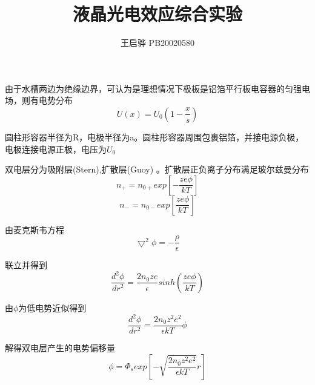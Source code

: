 \documentclass{report}
\title{\songti \zihao{2}\bfseries 液晶光电效应综合实验}
\author{王启骅 PB20020580}
\begin{document}
由于水槽两边为绝缘边界，可认为是理想情况下极板是铝箔平行板电容器的匀强电场，则有电势分布
\begin{equation}
	U(x)=U_0(1-\frac{x}{s})\nonumber
\end{equation}


圆柱形容器半径为R，电极半径为a。圆柱形容器周围包裹铝箔，并接电源负极，电极连接电源正极，电压为$ U_0 $


双电层分为吸附层(Stern),扩散层(Guoy) 。扩散层正负离子分布满足玻尔兹曼分布
\begin{equation}
	n_+=n_{0+}exp[-\frac{ze\phi}{kT}] \nonumber
\end{equation}
\begin{equation}
	n_-=n_{0-}exp[\frac{ze\phi}{kT}] \nonumber
\end{equation}


由麦克斯韦方程
\begin{equation}
	\bigtriangledown^2\phi=-\frac{\rho}{\epsilon} \nonumber
\end{equation}


联立并得到
\begin{equation}
	\dfrac{d^2\phi}{dr^2}=\frac{2n_0ze}{\epsilon}sinh(\frac{ze\phi}{kT})
	\nonumber
\end{equation}


由$ \phi $为低电势近似得到
\begin{equation}
	\dfrac{d^2\phi}{dr^2}=\frac{2n_0z^2e^2}{\epsilon kT}\phi
	\nonumber
\end{equation}


解得双电层产生的电势偏移量
\begin{equation}
	\phi=\Phi_sexp[-\sqrt{\frac{2n_0z^2e^2}{\epsilon kT}}r]
	\nonumber
\end{equation}
\end{document}
